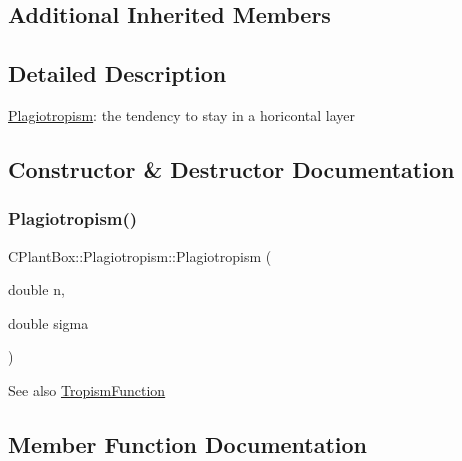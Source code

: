 \subsection*{Additional Inherited Members}


\subsection{Detailed Description}
\hyperlink{classCPlantBox_1_1Plagiotropism}{Plagiotropism}\+: the tendency to stay in a horicontal layer 

\subsection{Constructor \& Destructor Documentation}
\mbox{\label{classCPlantBox_1_1Plagiotropism_a8211f8da1e9a25f68f1bf3eeccc643ac}} 
\subsubsection{\texorpdfstring{Plagiotropism()}{Plagiotropism()}}
{\footnotesize\ttfamily C\+Plant\+Box\+::\+Plagiotropism\+::\+Plagiotropism (\begin{DoxyParamCaption}\item[{double}]{n,  }\item[{double}]{sigma }\end{DoxyParamCaption})\hspace{0.3cm}{\ttfamily [inline]}}

\begin{DoxySeeAlso}{See also}
\hyperlink{classCPlantBox_1_1TropismFunction}{Tropism\+Function} 
\end{DoxySeeAlso}


\subsection{Member Function Documentation}
\mbox{\label{classCPlantBox_1_1Plagiotropism_a4bd7b5b8a2864e78b06f2f27c7642253}} 
